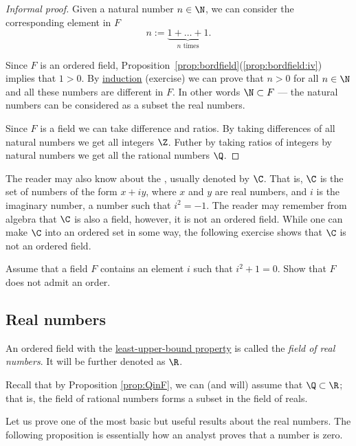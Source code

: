 \documentclass[12pt]{book}
\begin{document}
\begin{proof}[Informal proof]
Given a natural number $n \in \N$, we can consider the corresponding element in $F$
\[n:=\underbrace{1+\dots +1}_{\text{$n$ times}}.\]

Since $F$ is an ordered field,  Proposition~\ref{prop:bordfield}(\ref{prop:bordfield:iv}) implies that $1 > 0$.
By \hyperref[induction:thm]{induction} (exercise) we can prove that $n> 0$ for all $n \in \N$ and all these numbers are different in $F$.
In other words $\N\subset F$ --- the natural numbers can be considered as a subset the real numbers.

Since $F$ is a field we can take difference and ratios.
By taking differences of all natural numbers we get all integers $\Z$. 
Futher by taking ratios of integers by natural numbers we get all the rational numbers $\Q$.
\end{proof}


The reader may also know about the \emph{},
usually denoted by
$\C$.
That is, $\C$ is the set of numbers of
the form $x + iy$, where $x$ and $y$ are real numbers, and $i$ is the
imaginary number, a number such that $i^2 = -1$.
The reader may
remember from algebra that $\C$ is also a field, however, it is not an
ordered field.
While one can make $\C$ into an ordered set in some way, the following exercise shows that $\C$ is not an ordered field.

\begin{exercise}
Assume that a field $F$ contains an element $i$ such that $i^2+1=0$.
Show that $F$ does not admit an order.
\end{exercise}


\subsection*{Real numbers} \label{sec:setofreals}

 

\begin{defn}
An ordered field with the \hyperref[defn:lub]{least-upper-bound property} is called the \emph{field of real numbers}. 
It will be further denoted as $\R$.
\end{defn}

Recall that by Proposition \ref{prop:QinF}, we can (and will) assume that $\Q\subset \R$;
that is, the field of rational numbers forms a subset in the field of reals.

Let us prove one of the most basic but useful results about the real numbers.
The following proposition is essentially how an analyst proves that a number
is zero.
\end{document}
